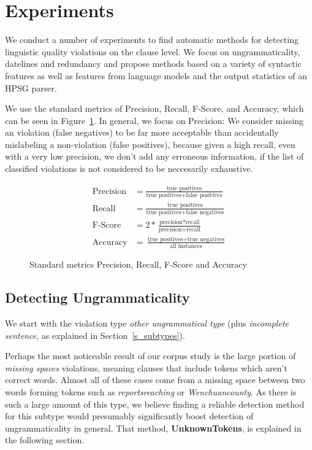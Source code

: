 \documentclass[a4paper,10pt]{scrartcl}
\theoremstyle{style}
\begin{document}
\newpage
\section{Experiments}
\label{experiments}
We conduct a number of experiments to find automatic methods for detecting linguistic quality violations on the clause level. We focus on ungrammaticality, datelines and redundancy and propose methods based on a variety of syntactic features as well as features from language models and the output statistics of an HPSG parser.

We use the standard metrics of Precision, Recall, F-Score, and Accuracy, which can be seen in Figure~\ref{metrics}. In general, we focus on Precision: We consider missing an violation (false negatives) to be far more acceptable than accidentally mislabeling a non-violation (false positives), because given a high recall, even with a very low precision, we don't add any erroneous information, if the list of classified violations is not considered to be neccesarily exhaustive.

\begin{figure}[H]
	\begin{subequations*}
	\begin{align*}
		\text{Precision} &= \frac{\text{true positives}}{\text{true positives} + \text{false positives}}\\
		\text{Recall} &= \frac{\text{true positives}}{\text{true positives} + \text{false negatives}}\\
		\text{F-Score} &= 2*\frac{\text{precision}*\text{recall}}{\text{precision}+\text{recall}}\\
		\text{Accuracy} &= \frac{\text{true positives}+\text{true negatives}}{\text{all instances}}
	\end{align*}
	\end{subequations*}
	\label{metrics}
	\caption{Standard metrics Precision, Recall, F-Score and Accuracy}
\end{figure}

\subsection{Detecting Ungrammaticality}
\label{sec_unknowntokens}
We start with the violation type \textit{other ungrammatical type} (plus \textit{incomplete sentence}, as explained in Section~\ref{s_subtypes}).

Perhaps the most noticeable result of our corpus study is the large portion of \textit{missing spaces} violations, meaning clauses that include tokens which aren't correct words. Almost all of these cases come from a missing space between two words forming tokens such as \textit{reportsreaching} or \textit{Wenchuancounty}. As there is such a large amount of this type, we believe finding a reliable detection method for this subtype would presumably significantly boost detection of ungrammaticality in general. That method, \textbf{UnknownTokens}, is explained in the following section.
\end{document}
